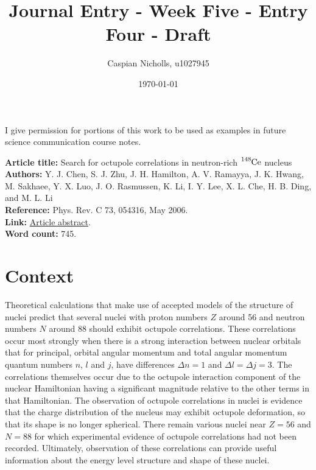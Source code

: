 \documentclass[12pt,a4paper]{article}
\begin{document}
\title{Journal Entry - Week Five - Entry Four - Draft}
\author{Caspian Nicholls, u1027945}
\date{\today}

\maketitle

\noindent
I give permission for portions of this work to be used as examples in future science communication course notes.

\medskip
\noindent
\textbf{Article title:} Search for octupole correlations in neutron-rich $\ce{^{148}Ce}$ nucleus \\
\textbf{Authors:} Y. J. Chen, S. J. Zhu, J. H. Hamilton, A. V. Ramayya, J. K. Hwang, M. Sakhaee, Y. X. Luo, J. O. Rasmussen, K. Li, I. Y. Lee, X. L. Che, H. B. Ding, and M. L. Li \\
\textbf{Reference:} Phys. Rev. C 73, 054316, May 2006. \\
\textbf{Link:}  \href{10.1103/PhysRevC.73.054316}{Article abstract}. \\
\textbf{Word count:} 745.

\section*{Context}
Theoretical calculations that make use of accepted models of the structure of nuclei predict that several nuclei with proton numbers $Z$ around 56 and neutron numbers $N$ around 88 should exhibit octupole correlations. These correlations occur most strongly when there is a strong interaction between nuclear orbitals that for principal, orbital angular momentum and total angular momentum quantum numbers $n$, $l$ and $j$, have differences $\Delta n = 1$ and $\Delta l = \Delta j = 3$. The correlations themselves occur due to the octupole interaction component of the nuclear Hamiltonian having a significant magnitude relative to the other terms in that Hamiltonian. The observation of octupole correlations in nuclei is evidence that the charge distribution of the nucleus may exhibit octupole deformation, so that its shape is no longer spherical. There remain various nuclei near $Z = 56$ and $N = 88$ for which experimental evidence of octupole correlations had not been recorded. Ultimately, observation of these correlations can provide useful information about the energy level structure and shape of these nuclei.
\end{document}
